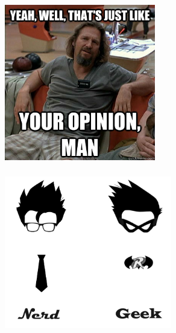 \documentclass[usenames,dvipsnames, 18pt, compress, aspectratio=169]{beamer}
\begin{document}
\begin{frame}
    \frametitle{}
    \begin{flushleft}
    \begin{figure}
        \includegraphics[width=0.588\textwidth,center]{opinion.jpg}
    \end{figure}
    \end{flushleft}
\end{frame}

\begin{frame}
    \frametitle{}
    \begin{center}
    \vspace{0.5cm}
    \begin{figure}
        \includegraphics[width=0.65\textwidth,center]{geek_nerd.jpg}
    \end{figure}
    \end{center}
\end{frame}
\end{document}
